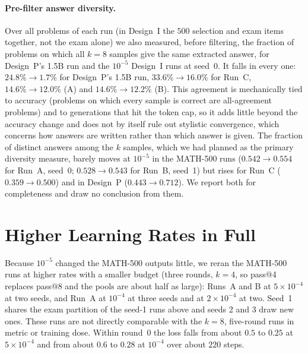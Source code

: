 \documentclass[runningheads]{llncs}
\begin{document}
\paragraph{Pre-filter answer diversity.}
Over all problems of each run (in Design~I the $500$ selection and exam items
together, not the exam alone) we also measured, before filtering, the fraction of
problems on which all $k=8$ samples give the same extracted answer, for
Design~P's 1.5B run and the $10^{-5}$ Design~I runs at seed~0. It falls in
every one: $24.8\%\to1.7\%$ for Design~P's 1.5B
run, $33.6\%\to16.0\%$ for Run~C, $14.6\%\to12.0\%$ (A) and $14.6\%\to12.2\%$
(B). This agreement is mechanically tied to accuracy (problems on
which every sample is correct are all-agreement problems) and to generations
that hit the token cap, so it adds little beyond the accuracy change and does not by itself
rule out stylistic convergence, which concerns how answers are written rather
than which answer is given. The fraction of distinct answers among the $k$
samples, which we had planned as the primary diversity measure, barely moves at
$10^{-5}$ in the MATH-500 runs ($0.542\to0.554$ for Run~A, seed~0; $0.528\to0.543$
for Run~B, seed~1) but rises for Run~C ($0.359\to0.500$) and in Design~P
($0.443\to0.712$). We report both for completeness
and draw no conclusion from them.

\section{Higher Learning Rates in Full}
\label{app:lrcheck}

Because $10^{-5}$ changed the MATH-500 outputs little, we reran the MATH-500 runs at
higher rates with a smaller budget (three rounds, $k=4$, so pass@4 replaces
pass@8 and the pools are about half as large): Runs~A and B at $5\times10^{-4}$
at two seeds, and Run~A at $10^{-4}$ at three seeds and at $2\times10^{-4}$ at
two. Seed~1 shares the exam partition of the seed-1 runs above and seeds 2 and 3
draw new ones. These runs are not directly comparable with the $k=8$, five-round
runs in metric or training dose. Within round~0 the loss falls from about $0.5$
to $0.25$ at $5\times10^{-4}$ and from about $0.6$ to $0.28$ at $10^{-4}$ over
about $220$ steps.
\end{document}
